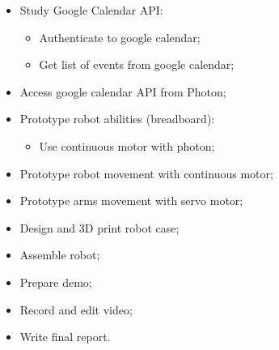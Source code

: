 \documentclass{sigchi-ext}
\begin{document}
\begin{itemize}
  \item Study Google Calendar API:
  \begin{itemize}
    \item Authenticate to google calendar;
    \item Get list of events from google calendar;
  \end{itemize}
  \item Access google calendar API from Photon;
  \item Prototype robot abilities (breadboard):
  \begin{itemize}
    \item Use continuous motor with photon;
  \end{itemize}
  \item Prototype robot movement with continuous motor;
  \item Prototype arms movement with servo motor;
  \item Design and 3D print robot case;
  \item Assemble robot;
  \item Prepare demo;
  \item Record and edit video;
  \item Write final report.
\end{itemize}


\end{document}
